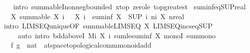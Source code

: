 \begin{isabellebody}
%
\isadelimproof
\ \ %
\endisadelimproof
%
\isatagproof
{}\isamarkupfalse%
\ {\isacharparenleft}{\kern0pt}intro\ summableI{\isacharunderscore}{\kern0pt}nonneg{\isacharunderscore}{\kern0pt}bounded{\isacharbrackleft}{\kern0pt}\ x{\isacharequal}{\kern0pt}top{\isacharbrackright}{\kern0pt}\ zero{\isacharunderscore}{\kern0pt}le\ top{\isacharunderscore}{\kern0pt}greatest{\isacharparenright}{\kern0pt}%
\endisatagproof
{\isafoldproof}%
%
\isadelimproof
\isanewline
%
\endisadelimproof
\isanewline
{}\isamarkupfalse%
\ suminf{\isacharunderscore}{\kern0pt}eq{\isacharunderscore}{\kern0pt}SUP{\isacharunderscore}{\kern0pt}real{\isacharcolon}{\kern0pt}\isanewline
\ \ \ X{\isacharcolon}{\kern0pt}\ {\isachardoublequoteopen}summable\ X{\isachardoublequoteclose}\ {\isachardoublequoteopen}{\isasymAnd}i{\isachardot}{\kern0pt}\ {}\ {\isasymle}\ X\ i{\isachardoublequoteclose}\ \ {\isachardoublequoteopen}suminf\ X\ {\isacharequal}{\kern0pt}\ {\isacharparenleft}{\kern0pt}SUP\ i{\isachardot}{\kern0pt}\ {\isasymSum}n{\isacharless}{\kern0pt}i{\isachardot}{\kern0pt}\ X\ n{\isacharcolon}{\kern0pt}{\isacharcolon}{\kern0pt}real{\isacharparenright}{\kern0pt}{\isachardoublequoteclose}\isanewline
%
\isadelimproof
\ \ %
\endisadelimproof
%
\isatagproof
{}\isamarkupfalse%
\ {\isacharparenleft}{\kern0pt}intro\ LIMSEQ{\isacharunderscore}{\kern0pt}unique{\isacharbrackleft}{\kern0pt}OF\ summable{\isacharunderscore}{\kern0pt}LIMSEQ{\isacharbrackright}{\kern0pt}\ X\ LIMSEQ{\isacharunderscore}{\kern0pt}incseq{\isacharunderscore}{\kern0pt}SUP{\isacharparenright}{\kern0pt}\isanewline
\ \ \ \ \ {\isacharparenleft}{\kern0pt}auto\ intro{\isacharbang}{\kern0pt}{\isacharcolon}{\kern0pt}\ bdd{\isacharunderscore}{\kern0pt}aboveI{}{\isacharbrackleft}{\kern0pt}\ M{\isacharequal}{\kern0pt}{\isachardoublequoteopen}{\isasymSum}i{\isachardot}{\kern0pt}\ X\ i{\isachardoublequoteclose}{\isacharbrackright}{\kern0pt}\ sum{\isacharunderscore}{\kern0pt}le{\isacharunderscore}{\kern0pt}suminf\ X\ monoI\ sum{\isacharunderscore}{\kern0pt}mono{}{\isacharparenright}{\kern0pt}%
\endisatagproof
{\isafoldproof}%
%
\isadelimproof
%
\endisadelimproof
%
\isadelimdocument
%
\endisadelimdocument
%
\isatagdocument
%
\isamarkuptrue%
%
\endisatagdocument
{\isafolddocument}%
%
\isadelimdocument
%
\endisadelimdocument
{}\isamarkupfalse%
\isanewline
\ \ \ f\ g\ {\isacharcolon}{\kern0pt}{\isacharcolon}{\kern0pt}\ {\isachardoublequoteopen}nat\ {\isasymRightarrow}\ {\isacharprime}{\kern0pt}a{\isacharcolon}{\kern0pt}{\isacharcolon}{\kern0pt}{\isacharbraceleft}{\kern0pt}t{}{\isacharunderscore}{\kern0pt}space{\isacharcomma}{\kern0pt}topological{\isacharunderscore}{\kern0pt}comm{\isacharunderscore}{\kern0pt}monoid{\isacharunderscore}{\kern0pt}add{\isacharbraceright}{\kern0pt}{\isachardoublequoteclose}\isanewline

\end{isabellebody}
